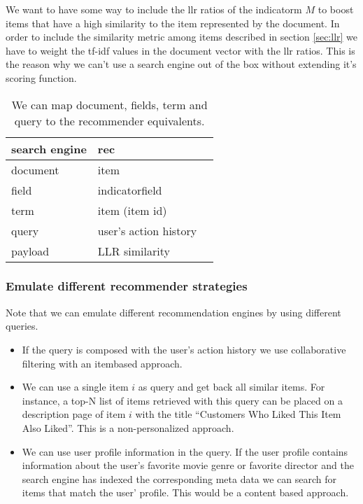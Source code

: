  We want to have some way to include the \gls{llr} ratios of the \gls{indicatorm} $M$ to boost items that have a high similarity to the item represented by the document. In order to include the similarity metric among items described in section \ref{sec:llr} we have to weight the tf-idf values in the document vector with the \gls{llr} ratios. This is the reason why we can't use a search engine out of the box without extending it's scoring function. 

\begin{table}
\begin{center}
\begin{tabular}{lll}
 search engine & \gls{rec}\\ \hline
  document & item\\ 
 field & indicatorfield \\
 term & item (item id)    \\
 query & user's action history \\
payload & LLR similarity \\
\end{tabular}
\end{center}
\caption{We can map document, fields, term and query to the recommender equivalents.}
\label{tbl:comparison}
\end{table}

\subsubsection{Emulate different recommender strategies}

Note that we can emulate different recommendation engines by using different queries.
\begin{itemize}
\item If the query is composed with the user's action history we use collaborative filtering with an \gls{itembased} approach.
\item We can use a single item $i$ as query and get back all similar items. For instance, a top-N list of items retrieved with this query can be placed on a description page of item $i$ with the title ``Customers Who Liked This Item Also Liked''. This is a non-personalized approach.
\item We can use user profile information in the query. If the user profile contains information about the user's favorite movie genre or favorite director and the search engine has indexed the corresponding meta data we can search for items that match the user' profile. This would be a content based approach.
\end{itemize}
